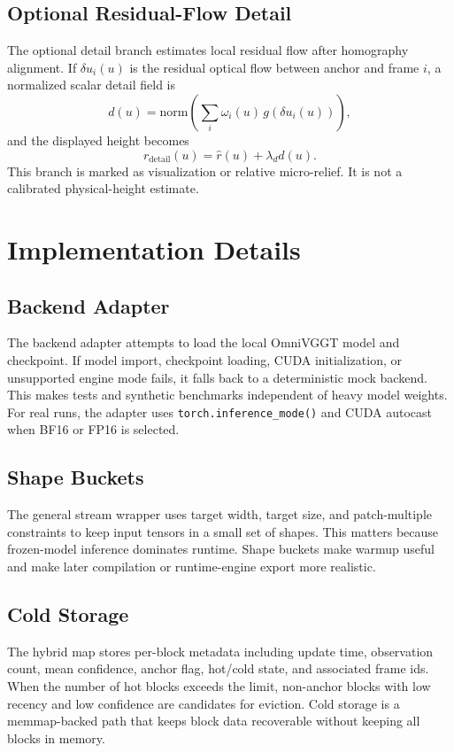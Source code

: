 \documentclass[conference]{IEEEtran}
\begin{document}
\subsection{Optional Residual-Flow Detail}
The optional detail branch estimates local residual flow after homography alignment. If $\delta u_i(u)$ is the residual optical flow between anchor and frame $i$, a normalized scalar detail field is
\begin{equation}
d(u)=\mathrm{norm}\left(\sum_i \omega_i(u)\,g(\delta u_i(u))\right),
\end{equation}
and the displayed height becomes
\begin{equation}
r_{\mathrm{detail}}(u)=\hat{r}(u)+\lambda_d d(u).
\end{equation}
This branch is marked as visualization or relative micro-relief. It is not a calibrated physical-height estimate.

\section{Implementation Details}
\subsection{Backend Adapter}
The backend adapter attempts to load the local OmniVGGT model and checkpoint. If model import, checkpoint loading, CUDA initialization, or unsupported engine mode fails, it falls back to a deterministic mock backend. This makes tests and synthetic benchmarks independent of heavy model weights. For real runs, the adapter uses \texttt{torch.inference\_mode()} and CUDA autocast when BF16 or FP16 is selected.

\subsection{Shape Buckets}
The general stream wrapper uses target width, target size, and patch-multiple constraints to keep input tensors in a small set of shapes. This matters because frozen-model inference dominates runtime. Shape buckets make warmup useful and make later compilation or runtime-engine export more realistic.

\subsection{Cold Storage}
The hybrid map stores per-block metadata including update time, observation count, mean confidence, anchor flag, hot/cold state, and associated frame ids. When the number of hot blocks exceeds the limit, non-anchor blocks with low recency and low confidence are candidates for eviction. Cold storage is a memmap-backed path that keeps block data recoverable without keeping all blocks in memory.
\end{document}
